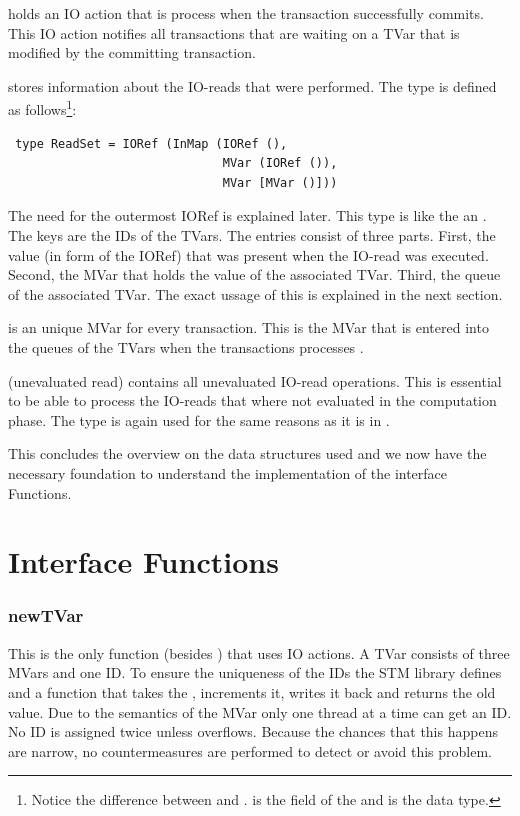  holds an IO action that is process when the transaction successfully commits.
This IO action notifies all transactions that are waiting on a TVar that is modified by the 
committing transaction.

 stores information about the IO-reads that were performed. The type 
is defined as follows\footnote{Notice the difference between 
 and .  is the field of the  and 
 is the data type.}:
\begin{lstlisting}
 type ReadSet = IORef (InMap (IORef (), 
                              MVar (IORef ()), 
                              MVar [MVar ()]))
\end{lstlisting}
The need for the outermost IORef is explained later. This type is like the  an 
. The keys are the IDs of the TVars. The entries consist of three parts. First,
the value (in form of the IORef) that was present when the IO-read was executed. Second, the 
MVar that holds the value of the associated TVar. Third, the queue of the associated TVar.
The exact ussage of this is explained in the next section.

 is an unique MVar for every transaction. This is the MVar that is entered into
the queues of the TVars when the transactions processes .

(unevaluated read) contains all unevaluated IO-read operations. This is essential to be able to 
process the IO-reads that where not evaluated in the computation phase. The  type
is again used for the same reasons as it is in .

This concludes the overview on the data structures used and we now have the necessary foundation
to understand the implementation of the interface Functions.

\section{Interface Functions}
\label{sec:IFFun}

\subsubsection{newTVar}
\label{sec:newTVar}
This is the only function (besides ) that uses IO actions. A TVar consists of three MVars
and one ID. To ensure the uniqueness of the IDs the STM library defines 
and a function  that takes the , increments it, writes it back 
and returns the old value. Due to the semantics of the MVar only one thread at a time can get an ID. 
No ID is assigned twice unless  overflows. Because the chances that this happens 
are narrow, no countermeasures are performed to detect or avoid this problem. 


